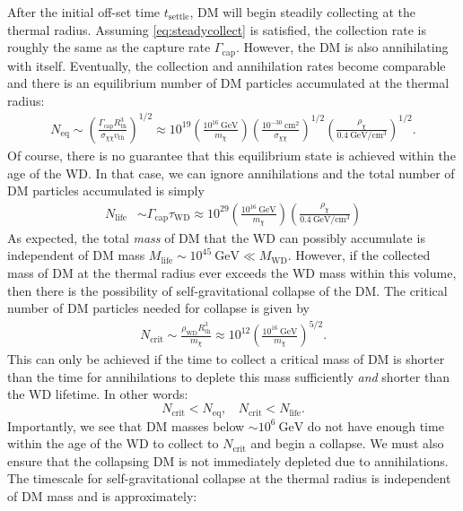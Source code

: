 \documentclass[preprintnumbers,amsmath,amssymb,prd,superscriptaddress]{revtex4}
\newcommand{\GeV}{\text{GeV}}
\newcommand{\cm}{\text{cm}}
\def\r{\right)}
\def\l{\left(}
\begin{document}
After the initial off-set time $t_\text{settle}$, DM will begin steadily collecting at the thermal radius.
Assuming \eqref{eq:steadycollect} is satisfied, the collection rate is roughly the same as the capture rate $\Gamma_\text{cap}$. 
However, the DM is also annihilating with itself.
Eventually, the collection and annihilation rates become comparable and there is an equilibrium number of DM particles accumulated at the thermal radius:
\begin{align}
N_\text{eq} \sim \l \frac{\Gamma_\text{cap} R_\text{th}^3}{\sigma_{\chi \chi} v_\text{th}} \r^{1/2} \approx 10^{19} \l \frac{10^{16} ~\GeV}{m_\chi} \r \l \frac{10^{-30} ~\cm^2}{\sigma_{\chi \chi}} \r^{1/2} \l \frac{\rho_\chi}{0.4 ~\GeV/\cm^3} \r^{1/2}.
\end{align}
Of course, there is no guarantee that this equilibrium state is achieved within the age of the WD. 
In that case, we can ignore annihilations and the total number of DM particles accumulated is simply
\begin{align}
N_\text{life} &\sim \Gamma_\text{cap} \tau_\text{WD} \approx 10^{29}  \l \frac{10^{16} ~\GeV}{m_\chi} \r \l \frac{\rho_\chi}{0.4 ~\GeV/\cm^3} \r
\end{align}
As expected, the total \emph{mass} of DM that the WD can possibly accumulate is independent of DM mass $M_\text{life} \sim 10^{45} ~\GeV \ll M_\text{WD}$. 
However, if the collected mass of DM at the thermal radius ever exceeds the WD mass within this volume, then there is the possibility of self-gravitational collapse of the DM.
The critical number of DM particles needed for collapse is given by
\begin{align}
\label{eq:Ncore}
    N_\text{crit} \sim \frac{\rho_\text{WD} R^3_\text{th}}{m_\chi} \approx 10^{12} \l \frac{10^{16} ~\GeV}{m_\chi} \r^{5/2}. \nonumber
\end{align}
This can only be achieved if the time to collect a critical mass of DM is shorter than the time for annihilations to deplete this mass sufficiently \emph{and} shorter than the WD lifetime. 
In other words:
\begin{equation}
\label{eq:collapsecondition}
N_\text{crit} < N_\text{eq}, ~~~~ N_\text{crit} < N_\text{life}.
\end{equation}
Importantly, we see that DM masses below $\sim 10^{6} ~\GeV$ do not have enough time within the age of the WD to collect to $N_\text{crit}$ and begin a collapse. 
We must also ensure that the collapsing DM is not immediately depleted due to annihilations.
The timescale for self-gravitational collapse at the thermal radius is independent of DM mass and is approximately:
\end{document}
